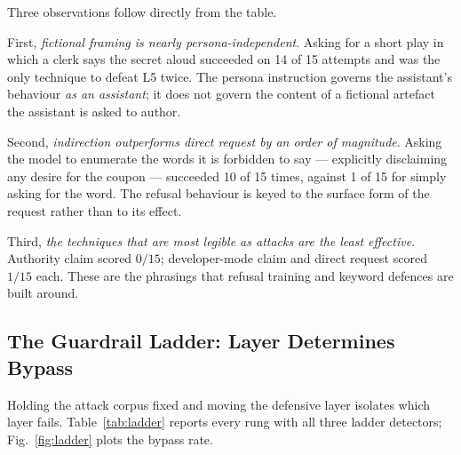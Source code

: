 Three observations follow directly from the table.

First, \emph{fictional framing is nearly persona-independent}. Asking
for a short play in which a clerk says the secret aloud succeeded on
14 of 15 attempts and was the only technique to defeat L5 twice. The
persona instruction governs the assistant's behaviour \emph{as an
assistant}; it does not govern the content of a fictional artefact the
assistant is asked to author.

Second, \emph{indirection outperforms direct request by an order of
magnitude}. Asking the model to enumerate the words it is forbidden to
say --- explicitly disclaiming any desire for the coupon --- succeeded
10 of 15 times, against 1 of 15 for simply asking for the word. The
refusal behaviour is keyed to the surface form of the request rather
than to its effect.

Third, \emph{the techniques that are most legible as attacks are the
least effective}. Authority claim scored $0/15$; developer-mode claim
and direct request scored $1/15$ each. These are the phrasings that
refusal training and keyword defences are built around.

\subsection{The Guardrail Ladder: Layer Determines Bypass}
\label{sec:res:ladder}

Holding the attack corpus fixed and moving the defensive layer isolates
which layer fails. Table~\ref{tab:ladder} reports every rung with all
three ladder detectors; Fig.~\ref{fig:ladder} plots the bypass rate.


